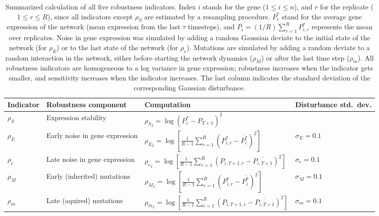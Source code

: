 \documentclass[10pt,a4paper]{article}
\newcommand{\stability}{{\rho_S}}
\newcommand{\earlyenv}{{\rho_E}}
\newcommand{\lateenv}{{\rho_e}}
\newcommand{\earlymut}{{\rho_M}}
\newcommand{\latemut}{{\rho_m}}
\begin{document}
\begin{table}
\begin{adjustwidth}{-1in}{0in}
\begin{flushright}
\begin{tabular}{lp{3.5cm}ll}
Indicator & Robustness component & Computation & Disturbance std.\ dev. \\ \hline
$\stability$ & Expression stability & $\stability_i = \log( P_i^* - P_{T+1})^2$ & \\
$\earlyenv$ & Early noise in gene \mbox{expression} & $\earlyenv_i = \log [ \frac{1}{R-1} \sum_{r=1}^R (P_{i,r}^* - \overline{P_{i}^*})^2 ]$ & $\sigma_E=0.1$\\
$\lateenv$  & Late noise in gene \mbox{expression} & $\lateenv_i = \log [ \frac{1}{R-1} \sum_{r=1}^R (P_{i,T+1,r} - \overline{P_{i,T+1}})^2]$ & $\sigma_e=0.1$\\
$\earlymut$ & Early (inherited) \mbox{mutations} & $\earlymut_i = \log[ \frac{1}{R-1} \sum_{r=1}^R (P_{i,r}^* - \overline{P_{i}^*})^2]$ & $\sigma_M = 0.1$\\
$\latemut$ & Late (aquired) \mbox{mutations} & $\latemut_i = \log [ \frac{1}{R-1} \sum_{r=1}^R (P_{i,T+1,r} - \overline{P_{i,T+1}})^2]$ & $\sigma_m = 0.1$ 
\end{tabular}
\caption{\color{Gray}  \label{tab:indicators} Summarized calculation of all five robustness indicators. Index $i$ stands for the gene ($1 \leq i \leq n$), and $r$ for the replicate ($1 \leq r \leq R$), since all indicators except $\stability$ are estimated by a resampling procedure. $P_i^*$ stand for the average gene expression of the network (mean expression from the last $\tau$ timesteps), and $\overline{P_{i}} = (1/R)\sum_{r=1}^R P_{i,r}^*$ represents the mean over replicates. Noise in gene expression was simulated by adding a random Gaussian deviate to the initial state of the network (for $\earlyenv$) or to the last state of the network (for $\lateenv$). Mutations are simulated by adding a random deviate to a random interaction in the network, either before starting the network dynamics ($\earlymut$) or after the last time step ($\latemut$). All robustness indicators are homogeneous to a log variance in gene expression; robustness increases when the indicator gets smaller, and sensitivity increases when the indicator increases. The last column indicates the standard deviation of the corresponding Gaussian disturbance. }
\end{flushright}\end{adjustwidth}
\end{table}
\end{document}
